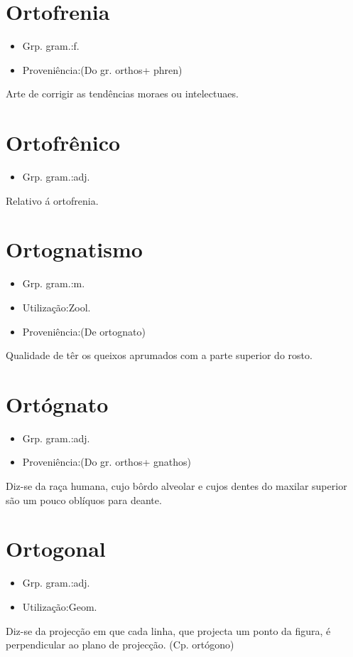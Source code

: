 \section{Ortofrenia}
\begin{itemize}
\item {Grp. gram.:f.}
\end{itemize}
\begin{itemize}
\item {Proveniência:(Do gr. \textunderscore orthos\textunderscore  + \textunderscore phren\textunderscore )}
\end{itemize}
Arte de corrigir as tendências moraes ou intelectuaes.
\section{Ortofrênico}
\begin{itemize}
\item {Grp. gram.:adj.}
\end{itemize}
Relativo á ortofrenia.
\section{Ortognatismo}
\begin{itemize}
\item {Grp. gram.:m.}
\end{itemize}
\begin{itemize}
\item {Utilização:Zool.}
\end{itemize}
\begin{itemize}
\item {Proveniência:(De \textunderscore ortognato\textunderscore )}
\end{itemize}
Qualidade de têr os queixos aprumados com a parte superior do rosto.
\section{Ortógnato}
\begin{itemize}
\item {Grp. gram.:adj.}
\end{itemize}
\begin{itemize}
\item {Proveniência:(Do gr. \textunderscore orthos\textunderscore  + \textunderscore gnathos\textunderscore )}
\end{itemize}
Diz-se da raça humana, cujo bôrdo alveolar e cujos dentes do maxilar superior são um pouco oblíquos para deante.
\section{Ortogonal}
\begin{itemize}
\item {Grp. gram.:adj.}
\end{itemize}
\begin{itemize}
\item {Utilização:Geom.}
\end{itemize}
Diz-se da projecção em que cada linha, que projecta um ponto da figura, é perpendicular ao plano de projecção.
(Cp. \textunderscore ortógono\textunderscore )
